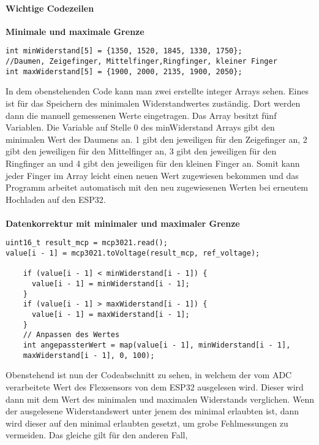 \documentclass[titlepage,12pt,twoside]{article}
\begin{document}
\paragraph{Wichtige Codezeilen}
\label{par:Wichtige Codezeilen}
\hfill \break
\hfill \break
\textbf{Minimale und maximale Grenze} \\
\footnotesize
\begin{lstlisting}
int minWiderstand[5] = {1350, 1520, 1845, 1330, 1750};  
//Daumen, Zeigefinger, Mittelfinger,Ringfinger, kleiner Finger
int maxWiderstand[5] = {1900, 2000, 2135, 1900, 2050};
\end{lstlisting}
\hfill \break
\normalsize
In dem obenstehenden Code kann man zwei erstellte integer Arrays sehen. Eines ist 
für das Speichern des minimalen Widerstandwertes zuständig. Dort werden dann die 
manuell gemessenen Werte eingetragen. Das Array besitzt fünf Variablen. Die Variable 
auf Stelle 0 des minWiderstand Arrays gibt den minimalen Wert des Daumens an. 1 gibt 
den jeweiligen für den Zeigefinger an, 2 gibt den jeweiligen für den Mittelfinger an, 
3 gibt den jeweiligen für den Ringfinger an und 4 gibt den jeweiligen für den 
kleinen Finger an. Somit kann jeder Finger im Array leicht einen neuen Wert 
zugewiesen bekommen und das Programm arbeitet automatisch mit den neu zugewiesenen 
Werten bei erneutem Hochladen auf den ESP32. \\
\\
\newpage
\textbf{Datenkorrektur mit minimaler und maximaler Grenze} \\
\footnotesize
\begin{lstlisting}
uint16_t result_mcp = mcp3021.read();
value[i - 1] = mcp3021.toVoltage(result_mcp, ref_voltage);

    if (value[i - 1] < minWiderstand[i - 1]) {
      value[i - 1] = minWiderstand[i - 1];
    }
    if (value[i - 1] > maxWiderstand[i - 1]) {
      value[i - 1] = maxWiderstand[i - 1];
    }
    // Anpassen des Wertes
    int angepassterWert = map(value[i - 1], minWiderstand[i - 1],
	maxWiderstand[i - 1], 0, 100);
\end{lstlisting}
\hfill \break
\normalsize
Obenstehend ist nun der Codeabschnitt zu sehen, in welchem der vom ADC verarbeitete 
Wert des Flexsensors von dem ESP32 ausgelesen wird. Dieser wird dann mit dem Wert 
des minimalen und maximalen Widerstands verglichen. Wenn der ausgelesene Widerstandswert 
unter jenem des minimal erlaubten ist, dann wird dieser auf den minimal erlaubten 
gesetzt, um grobe Fehlmessungen zu vermeiden. Das gleiche gilt für den anderen Fall, 
\end{document}
